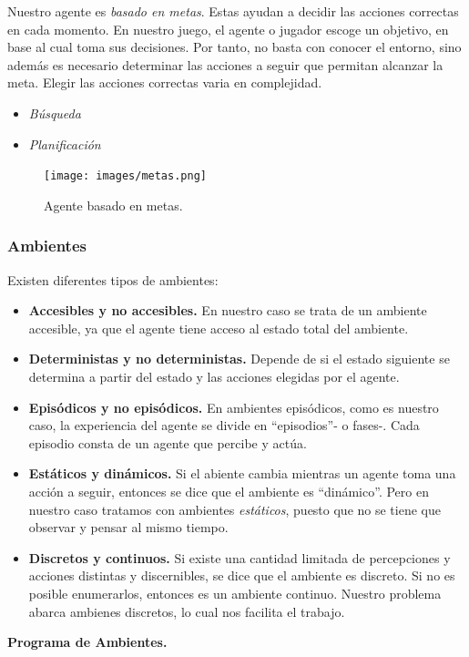 \documentclass[a4paper,12pt,oneside]{book}
\begin{document}
Nuestro agente es {\it basado en metas}. Estas ayudan a decidir las acciones
correctas en cada momento. En nuestro juego, el agente o jugador
escoge un objetivo, en base al cual toma sus decisiones. Por tanto, no
basta con conocer el entorno, sino además es necesario determinar las
acciones a seguir que permitan alcanzar la meta. Elegir las acciones
correctas varia en complejidad.
\begin{itemize}
\item {\it Búsqueda}
\item {\it Planificación}
\end{itemize}
\begin{figure}[!h]
  \centering
  \texttt{[image: images/metas.png]}
  \caption{Agente basado en metas.}
\end{figure}
\subsubsection{Ambientes}
Existen diferentes tipos de ambientes:
\begin{itemize}
\item {\bf Accesibles y no accesibles.} En nuestro caso se trata de un
  ambiente accesible, ya que el agente tiene acceso al estado total
  del ambiente.
\item {\bf Deterministas y no deterministas.} Depende de si el estado
  siguiente se determina a partir del estado y las acciones elegidas
  por el agente.
\item {\bf Episódicos y no episódicos.} En ambientes episódicos, como
  es nuestro caso, la experiencia del agente se divide en
  ``episodios''- o fases-. Cada episodio consta de un agente que
  percibe y actúa.
\item {\bf Estáticos y dinámicos.} Si el abiente cambia mientras un
  agente toma una acción a seguir, entonces se dice que el ambiente es
  ``dinámico''. Pero en nuestro caso tratamos con ambientes {\it
    estáticos}, puesto que no se tiene que observar y pensar al mismo tiempo.
\item {\bf Discretos y continuos.} Si existe una cantidad limitada de
 percepciones y acciones distintas y discernibles, se dice que el
 ambiente es discreto. Si no es posible enumerarlos, entonces es un
 ambiente continuo. Nuestro problema abarca ambienes discretos, lo
 cual nos facilita el trabajo.
\end{itemize}

{\bf Programa de Ambientes.}\\
\end{document}
